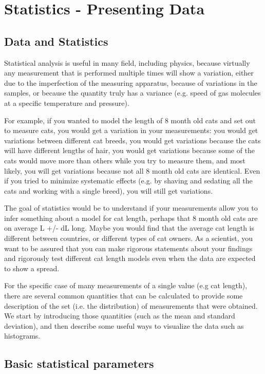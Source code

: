 \chapter{Statistics - Presenting Data}
\label{Chap:statData}
\section{Data and Statistics}

Statistical analysis is useful in many field, including physics, because virtually any measurement that is performed multiple times will show a variation, either due to the imperfection of the measuring apparatus, because of variations in the samples, or because the quantity truly has a variance (e.g. speed of gas molecules at a specific temperature and pressure).

For example, if you wanted to model the length of 8 month old cats and set out to measure cats, you would get a variation in your measurements: you would get variations between different cat breeds, you would get variations because the cats will have different lengths of hair, you would get variations because some of the cats would move more than others while you try to measure them, and most likely, you will get variations because not all 8 month old cats are identical. Even if you tried to minimize systematic effects (e.g. by shaving and sedating all the cats and working with a single breed), you will still get variations. 

The goal of statistics would be to understand if your measurements allow you to infer something about a model for cat length, perhaps that 8 month old cats are on average L +/- dL long. Maybe you would find that the average cat length is different between countries, or different types of cat owners. As a scientist, you want to be assured that you can make rigorous statements about your findings and rigorously test different cat length models even when the data are expected to show a spread.

For the specific case of many measurements of a single value (e.g cat length), there are several common quantities that can be calculated to provide some description of the set (i.e. the distribution) of measurements that were obtained. We start by introducing those quantities (such as the mean and standard deviation), and then describe some useful ways to visualize the data such as histograms.

\section{Basic statistical parameters}

